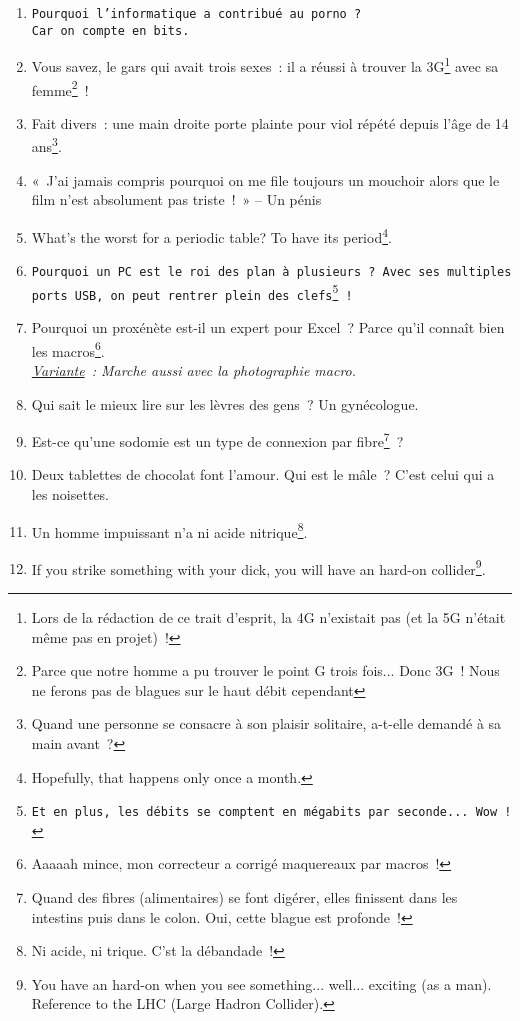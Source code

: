 \documentclass[10pt,a5paper,fullpage]{book}
\begin{document}
	\begin{enumerate}
		\item \texttt{Pourquoi l’informatique a contribué au porno~? \\Car on compte en bits.}
		\item Vous savez, le gars qui avait trois sexes~: il a réussi à trouver la 3G\footnote{Lors de la rédaction de ce trait d'esprit, la 4G n'existait pas (et la 5G n'était même pas en projet)~!} avec sa femme\footnote{Parce que notre homme a pu trouver le point G trois fois... Donc 3G~! Nous ne ferons pas de blagues sur le haut débit cependant}~!
		\item Fait divers~: une main droite porte plainte pour viol répété depuis l’âge de 14 ans\footnote{Quand une personne se consacre à son plaisir solitaire, a-t-elle demandé à sa main avant~?}.
		\item «~J’ai jamais compris pourquoi on me file toujours un mouchoir alors que le film n’est absolument pas triste~!~» -- Un pénis
		\item What’s the worst for a periodic table? To have its period\footnote{Hopefully, that happens only once a month.}.
		\item \texttt{Pourquoi un PC est le roi des plan à plusieurs~? Avec ses multiples ports USB, on peut rentrer plein des clefs\footnote{Et en plus, les débits se comptent en mégabits par seconde... Wow~!}~!~}
		\item Pourquoi un proxénète est-il un expert pour Excel~? Parce qu’il connaît bien les macros\footnote{Aaaaah mince, mon correcteur a corrigé maquereaux par macros~!}.
		\\ \textit{\underline{Variante}~: Marche aussi avec la photographie macro.}			
		\item Qui sait le mieux lire sur les lèvres des gens~? Un gynécologue.
		\item Est-ce qu'une sodomie est un type de connexion par fibre\footnote{Quand des fibres (alimentaires) se font digérer, elles finissent dans les intestins puis dans le colon. Oui, cette blague est profonde~!}~?
		\item Deux tablettes de chocolat font l’amour. Qui est le mâle~? C’est celui qui a les noisettes. 
		\item Un homme impuissant n’a ni acide nitrique\footnote{Ni acide, ni trique. C'st la débandade~!}.
		\item If you strike something with your dick, you will have an hard-on collider\footnote{You have an hard-on when you see something... well... exciting (as a man). Reference to the LHC (Large Hadron Collider).}. 

\end{enumerate}
\end{document}
